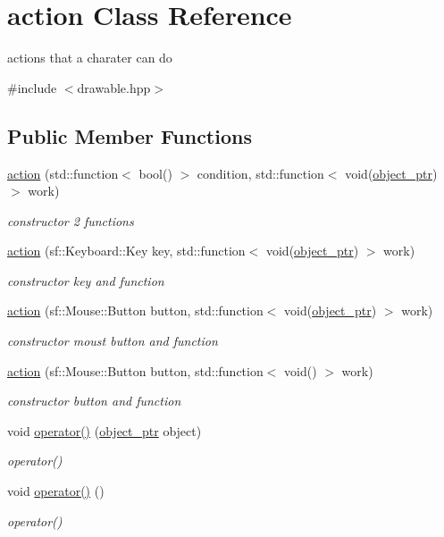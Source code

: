 \hypertarget{classaction}{}\section{action Class Reference}
\label{classaction}


actions that a charater can do  




{\ttfamily \#include $<$drawable.\+hpp$>$}

\subsection*{Public Member Functions}
\begin{DoxyCompactItemize}
\item 
\hyperlink{classaction_a481b1b2e3892600143fd7b2db4ac5729}{action} (std\+::function$<$ bool() $>$ condition, std\+::function$<$ void(\hyperlink{typedefs_8hpp_aab5add95f06d2ba25dbfed8eb07274fa}{object\+\_\+ptr}) $>$ work)
\begin{DoxyCompactList}\small\item\em constructor 2 functions \end{DoxyCompactList}\item 
\hyperlink{classaction_a504531cbc56e9c4a60b4e5d40bc018a6}{action} (sf\+::\+Keyboard\+::\+Key key, std\+::function$<$ void(\hyperlink{typedefs_8hpp_aab5add95f06d2ba25dbfed8eb07274fa}{object\+\_\+ptr}) $>$ work)
\begin{DoxyCompactList}\small\item\em constructor key and function \end{DoxyCompactList}\item 
\hyperlink{classaction_abf43e8dfaeca2df9d356fbfd4d1790ba}{action} (sf\+::\+Mouse\+::\+Button button, std\+::function$<$ void(\hyperlink{typedefs_8hpp_aab5add95f06d2ba25dbfed8eb07274fa}{object\+\_\+ptr}) $>$ work)
\begin{DoxyCompactList}\small\item\em constructor moust button and function \end{DoxyCompactList}\item 
\hyperlink{classaction_a55a91caa9803002fa7ddd6e9e9e46dc6}{action} (sf\+::\+Mouse\+::\+Button button, std\+::function$<$ void() $>$ work)
\begin{DoxyCompactList}\small\item\em constructor button and function \end{DoxyCompactList}\item 
void \hyperlink{classaction_ab4f8d0f7552450455977d09a889c18c7}{operator()} (\hyperlink{typedefs_8hpp_aab5add95f06d2ba25dbfed8eb07274fa}{object\+\_\+ptr} object)
\begin{DoxyCompactList}\small\item\em operator() \end{DoxyCompactList}\item 
void \hyperlink{classaction_a92c003677656b5b3e6e58b19376e6b04}{operator()} ()
\begin{DoxyCompactList}\small\item\em operator() \end{DoxyCompactList}\end{DoxyCompactItemize}


